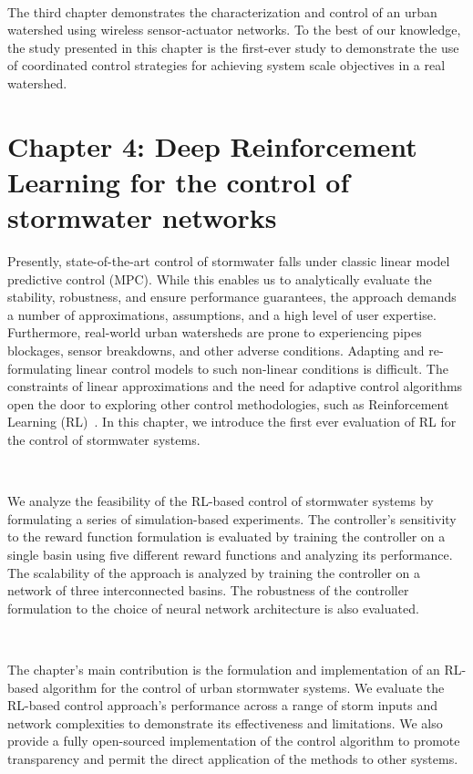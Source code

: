 \

The third chapter demonstrates the characterization and control of an urban watershed using wireless sensor-actuator networks. 
To the best of our knowledge, the study presented in this chapter is the first-ever study to demonstrate the use of coordinated control strategies for achieving system scale objectives in a real watershed.

\section{Chapter 4: Deep Reinforcement Learning for the control of stormwater networks}

Presently, state-of-the-art control of stormwater falls under classic linear model predictive control (MPC)\cite{Wong_Kerkez_2018}.
While this enables us to analytically evaluate the stability, robustness, and ensure performance guarantees, the approach demands a number of approximations, assumptions, and a high level of user expertise\cite{Wong_Kerkez_2018, Ocampo-Martinez_2015, joseph2014hybrid}.
Furthermore, real-world urban watersheds are prone to experiencing pipes blockages, sensor breakdowns, and other adverse conditions\cite{national2009urban}.
Adapting and re-formulating linear control models to such non-linear conditions is difficult.
The constraints of linear approximations and the need for adaptive control algorithms open the door to exploring other control methodologies, such as Reinforcement Learning (RL)~\cite{Sutton98}.
In this chapter, we introduce the first ever evaluation of RL for the control of stormwater systems.

\

We analyze the feasibility of the RL-based control of stormwater systems by formulating a series of simulation-based experiments.
The controller's sensitivity to the reward function formulation is evaluated by training the controller on a single basin using five different reward functions and analyzing its performance.
The scalability of the approach is analyzed by training the controller on a network of three interconnected basins.
The robustness of the controller formulation to the choice of neural network architecture is also evaluated.


\

The chapter's main contribution is the formulation and implementation of an RL-based algorithm for the control of urban stormwater systems.
We evaluate the RL-based control approach's performance across a range of storm inputs and network complexities to demonstrate its effectiveness and limitations.
We also provide a fully open-sourced implementation of the control algorithm to promote transparency and permit the direct application of the methods to other systems.


